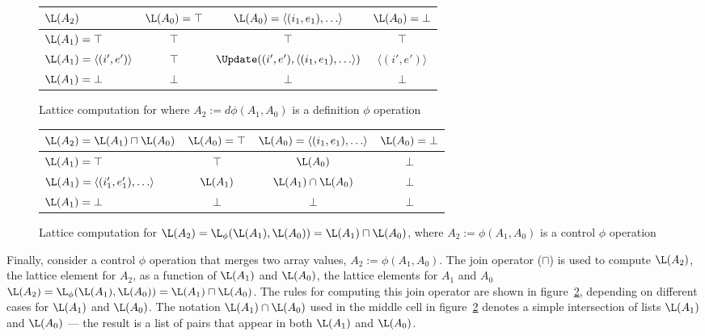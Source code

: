 \begin{figure}%
\begin{center}
\begin{tabular}{|l||c|c|c|}
\hline
$\L(A_2)$ & $\L(A_0) = \top$ & $\L(A_0) = \langle (i_1,e_1), \ldots \rangle $ & $\L(A_0) = \bot$ \\
\hline \hline
$\L(A_1) = \top$ & $\top$ & $\top$ & $\top$ \\
\hline
$\L(A_1) = \langle(i',e')\rangle$ & $\top$ & $\Update((i',e'),\langle (i_1,e_1), \ldots \rangle)$ & $\langle(i',e')\rangle$ \\
\hline
$\L(A_1) = \bot$ & $\bot$ & $\bot$ & $\bot$ \\
\hline
\end{tabular}
\end{center}
\caption{Lattice computation for 
where $A_2 := d\phi(A_1, A_0)$ is
a definition $\phi$ operation}
\label{fig:dphi}
\end{figure}


\begin{figure}%
\begin{center}
\begin{tabular}{|l||c|c|c|}
\hline
$\L(A_2) = \L(A_1) \sqcap \L(A_0) $ & $\L(A_0) = \top$ & $\L(A_0) = \langle (i_1,e_1), \ldots \rangle $ & $\L(A_0) = \bot$ \\
\hline \hline
$\L(A_1) = \top$ & $\top$ & $\L(A_0)$ & $\bot$ \\
\hline
$\L(A_1) = \langle(i'_1,e'_1), \ldots\rangle$ & $\L(A_1)$ & $\L(A_1) \cap \L(A_0)$ & $\bot$ \\
\hline
$\L(A_1) = \bot$ & $\bot$ & $\bot$ & $\bot$ \\
\hline
\end{tabular}
\end{center}
\caption{Lattice computation for 
$\L(A_2) = \L_{\phi}(\L(A_1), \L(A_0)) = \L(A_1) \sqcap \L(A_0) $,
where $A_2 := \phi(A_1, A_0)$ is
a control $\phi$ operation}
\label{fig:join}
\end{figure}

Finally,
consider a control $\phi$ operation that merges two array values, $A_2 := \phi(A_1, A_0)$.
The join operator ($\sqcap$) is used to compute $\L(A_2)$,
the lattice element for $A_2$, as a function of 
$\L(A_1)$ and $\L(A_0)$,
the lattice elements for $A_1$ and $A_0$ 
\ie\ $\L(A_2) = \L_{\phi}(\L(A_1), \L(A_0)) = \L(A_1) \sqcap \L(A_0)$.
The rules for computing this
join operator are shown in figure~\ref{fig:join}, depending on
different cases for $\L(A_1)$ and $\L(A_0)$.
The notation $\L(A_1) \cap \L(A_0)$ used in the middle cell in
figure~\ref{fig:join} denotes a simple intersection of lists $\L(A_1)$ and 
$\L(A_0)$  --- the result is a list of pairs that appear in both
$\L(A_1)$ and 
$\L(A_0)$.


